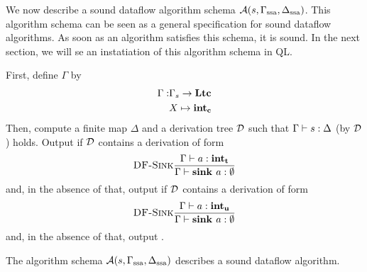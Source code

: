 We now describe a sound dataflow algorithm schema $\operatorname{\mathcal{A}}(s, \Gamma_\text{ssa}, \Delta_\text{ssa})$.
This algorithm schema can be seen as a general specification for sound dataflow algorithms.
As soon as an algorithm satisfies this schema, it is sound.
In the next section, we will se an instatiation of this algorithm schema in QL.

First, define $\Gamma$ by
\begin{align*}
    \Gamma: &\Gamma_s \to \textbf{Ltc}\\
    &X \mapsto \textbf{int}_\textbf{c}
\end{align*}
Then, compute a finite map $\Delta$ and a derivation tree $\operatorname{\mathcal{D}}$ 
such that $\Gamma \vdash {s}: \Delta$ (by $\operatorname{\mathcal{D}}$) holds.
Output  if $\operatorname{\mathcal{D}}$ contains a derivation of form
\begin{equation*}
    \textsc{DF-Sink}\frac{\displaystyle \Gamma \vdash {a}: \textbf{int}_\textbf{t}}{\displaystyle \Gamma \vdash {\textbf{sink }{a}}: \emptyset}
\end{equation*}
and, in the absence of that, output  if $\operatorname{\mathcal{D}}$ contains a derivation of form
\begin{equation*}
    \textsc{DF-Sink}\frac{\displaystyle \Gamma \vdash {a}: \textbf{int}_\textbf{u}}{\displaystyle \Gamma \vdash {\textbf{sink }{a}}: \emptyset}
\end{equation*}
and, in the absence of that, output .

\begin{corollary}
    The algorithm schema $\operatorname{\mathcal{A}}(s, \Gamma_\text{ssa}, \Delta_\text{ssa})$ describes a sound dataflow algorithm.
\end{corollary}

